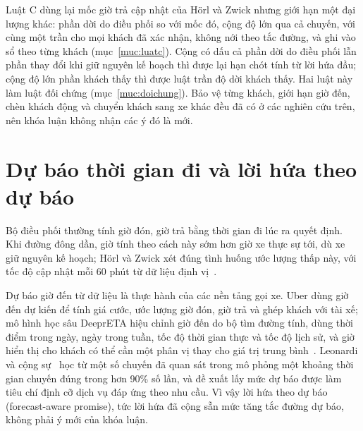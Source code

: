 Luật C dùng lại mốc giờ trả cập nhật của Hörl và Zwick nhưng giới hạn một đại lượng khác: phần dời do điều phối so với
mốc đó, cộng độ lớn qua cả chuyến, với cùng một trần cho mọi khách đã xác nhận, không nới theo tắc đường, và ghi vào sổ
theo từng khách (mục~\ref{muc:luatc}). Cộng có dấu cả phần dời do điều phối lẫn phần thay đổi khi giữ nguyên kế hoạch
thì được lại hạn chót tính từ lời hứa đầu; cộng độ lớn phần khách thấy thì được luật trần độ dời khách thấy. Hai luật
này làm luật đối chứng (mục~\ref{muc:doichung}). Bảo vệ từng khách, giới hạn giờ đến, chèn khách động và chuyển khách
sang xe khác đều đã có ở các nghiên cứu trên, nên khóa luận không nhận các ý đó là mới.

\section{Dự báo thời gian đi và lời hứa theo dự báo}
\label{muc:c2-dubao}

Bộ điều phối thường tính giờ đón, giờ trả bằng thời gian đi lúc ra quyết định. Khi đường đông dần, giờ tính theo cách
này sớm hơn giờ xe thực sự tới, dù xe giữ nguyên kế hoạch; Hörl và Zwick xét đúng tình huống ước lượng thấp này, với
tốc độ cập nhật mỗi 60 phút từ dữ liệu định vị~\cite{horl2022}.

Dự báo giờ đến từ dữ liệu là thực hành của các nền tảng gọi xe. Uber dùng giờ đến dự kiến để tính giá cước, ước lượng
giờ đón, giờ trả và ghép khách với tài xế; mô hình học sâu DeeprETA hiệu chỉnh giờ đến do bộ tìm đường tính, dùng
thời điểm trong ngày, ngày trong tuần, tốc độ thời gian thực và tốc độ lịch sử, và giờ hiển thị cho khách có thể cần
một phân vị thay cho giá trị trung bình~\cite{hu2022}. Leonardi và cộng sự~\cite{leonardi2024} học từ một số chuyến đã
quan sát trong mô phỏng một khoảng thời gian chuyến đúng trong hơn 90\% số lần, và đề xuất lấy mức dự báo được làm
tiêu chí định cỡ dịch vụ đáp ứng theo nhu cầu. Vì vậy lời hứa theo dự báo (forecast-aware promise), tức lời hứa đã
cộng sẵn mức tăng tắc đường dự báo, không phải ý mới của khóa luận.

